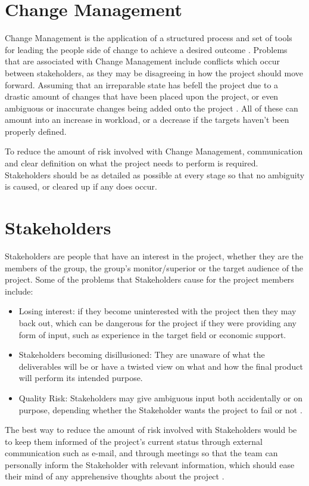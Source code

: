 \section{Change Management}
Change Management is the application of a structured process and set of tools
for leading the people side of change to achieve a desired outcome
\cite{changeManDef}. Problems that are associated with Change Management
include conflicts which occur between stakeholders, as they may be disagreeing 
in how the project should move forward. Assuming that an irreparable state has 
befell the project due to a drastic amount of changes that have been placed upon 
the project, or even ambiguous or inaccurate changes being added onto the project 
\cite{RiskList}. All of these can amount into an increase in workload, or a 
decrease if the targets haven't been properly defined.

To reduce the amount of risk involved with Change Management, communication and
clear definition on what the project needs to perform is required. Stakeholders
should be as detailed as possible at every stage so that no ambiguity is caused,
or cleared up if any does occur.

\section{Stakeholders}
Stakeholders are people that have an interest in the project, whether they are
the members of the group, the group's monitor/superior or the target audience of
the project. Some of the problems that Stakeholders cause for the project
members include: 

\begin{itemize}
	\item Losing interest: if they become uninterested with the project then 
	they may back out, which can be dangerous for the project if they were 
	providing any form of input, such as experience in the target field or 
	economic support.
	\item Stakeholders becoming disillusioned: They are unaware of what the 
	deliverables will be or have a twisted view on what and how the final product 
	will perform its intended purpose.
	\item Quality Risk: Stakeholders may give ambiguous input both accidentally 
	or on purpose, depending whether the Stakeholder wants the project to fail or 
	not \cite{RiskList}.
\end{itemize}

The best way to reduce the amount of risk involved with Stakeholders would be to
keep them informed of the project's current status through external communication 
such as e-mail, and through meetings so that the team can personally inform the 
Stakeholder with relevant information, which should ease their mind of any 
apprehensive thoughts about the project \cite{stakeInfo}.


